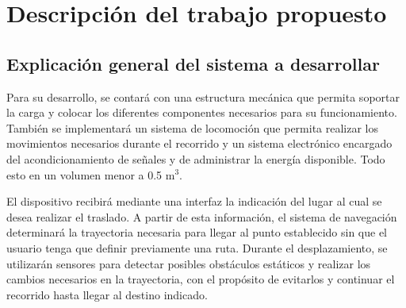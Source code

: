 %
%

\chapter{Descripción del trabajo propuesto}
\label{cap:proto-descripcion-propuesta}


\section{Explicación general del sistema a desarrollar}

Para su desarrollo, se contará con una estructura mecánica que permita soportar la carga y colocar los diferentes componentes necesarios para su funcionamiento. También se implementará un sistema de locomoción que permita realizar los movimientos necesarios durante el recorrido y un sistema electrónico encargado del acondicionamiento de señales y de administrar la energía disponible. Todo esto en un volumen menor a 0.5 m$^3$.

El dispositivo recibirá mediante una interfaz la indicación del lugar al cual se desea realizar el traslado. A partir de esta información, el sistema de navegación determinará la trayectoria necesaria para llegar al punto establecido sin que el usuario tenga que definir previamente una ruta. Durante el desplazamiento, se utilizarán sensores para detectar posibles obstáculos estáticos y realizar los cambios necesarios en la trayectoria, con el propósito de evitarlos y continuar el recorrido hasta llegar al destino indicado.

